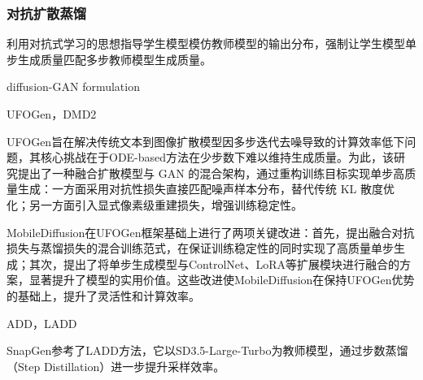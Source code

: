 \documentclass[11pt,a4paper,UTF8]{ctexart}
\begin{document}
\subsubsection{对抗扩散蒸馏}

利用对抗式学习的思想指导学生模型模仿教师模型的输出分布，强制让学生模型单步生成质量匹配多步教师模型生成质量。

diffusion-GAN formulation\cite{wang2022diffusion,xiao2021tackling,xu2024semi}

UFOGen\cite{xu2024ufogen}，DMD2\cite{yin2024improved}

UFOGen\cite{xu2024ufogen}旨在解决传统文本到图像扩散模型因多步迭代去噪导致的计算效率低下问题，其核心挑战在于ODE-based方法在少步数下难以维持生成质量\cite{xu2024semi}。为此，该研究提出了一种融合扩散模型与 GAN 的混合架构，通过重构训练目标实现单步高质量生成：一方面采用对抗性损失直接匹配噪声样本分布，替代传统 KL 散度优化；另一方面引入显式像素级重建损失，增强训练稳定性。

MobileDiffusion\cite{zhao2024mobilediffusion}在UFOGen框架基础上进行了两项关键改进：首先，提出融合对抗损失与蒸馏损失的混合训练范式，在保证训练稳定性的同时实现了高质量单步生成；其次，提出了将单步生成模型与ControlNet、LoRA等扩展模块进行融合的方案，显著提升了模型的实用价值。这些改进使MobileDiffusion在保持UFOGen优势的基础上，提升了灵活性和计算效率。

ADD\cite{sauer2024adversarial}，LADD\cite{sauer2024fast}

SnapGen\cite{hu2024snapgen}参考了LADD方法，它以SD3.5-Large-Turbo为教师模型，通过步数蒸馏（Step Distillation）进一步提升采样效率。
\fi

\newpage


\newpage
\end{document}
